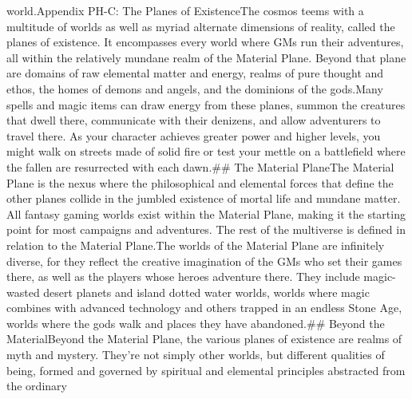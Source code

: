 \documentclass[
]{article}
\begin{document}
{{{world.}{Appendix PH-C: The Planes of ExistenceThe cosmos teems with a multitude of worlds as well as myriad alternate dimensions of reality, called the planes of existence. It encompasses every world where GMs run their adventures, all within the relatively mundane realm of the Material Plane. Beyond that plane are domains of raw elemental matter and energy, realms of pure thought and ethos, the homes of demons and angels, and the dominions of the gods.Many spells and magic items can draw energy from these planes, summon the creatures that dwell there, communicate with their denizens, and allow adventurers to travel there. As your character achieves greater power and higher levels, you might walk on streets made of solid fire or test your mettle on a battlefield where the fallen are resurrected with each dawn.\#\# The Material PlaneThe Material Plane is the nexus where the philosophical and elemental forces that define the other planes collide in the jumbled existence of mortal life and mundane matter. All fantasy gaming worlds exist within the Material Plane, making it the starting point for most campaigns and adventures. The rest of the multiverse is defined in relation to the Material Plane.The worlds of the Material Plane are infinitely diverse, for they reflect the creative imagination of the GMs who set their games there, as well as the players whose heroes adventure there. They include magic-wasted desert planets and island dotted water worlds, worlds where magic combines with advanced technology and others trapped in an endless Stone Age, worlds where the gods walk and places they have abandoned.\#\# Beyond the MaterialBeyond the Material Plane, the various planes of existence are realms of myth and mystery. They're not simply other worlds, but different qualities of being, formed and governed by spiritual and elemental principles abstracted from the ordinary }}}
\end{document}
